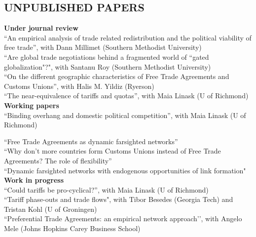 \documentclass[11pt]{res}
\begin{document}
\begin{resume}
\section{UNPUBLISHED PAPERS}\vspace{2mm}
{\bf Under journal review}\vspace{1.5mm}\\
{``An empirical analysis of trade related redistribution and the political viability of free trade''}, with Dann Millimet (Southern Methodist University) \vspace{1.5mm}\\
{``Are global trade negotiations behind a fragmented world of ``gated globalization"?"}, with Santanu Roy (Southern Methodist University) \vspace{1.5mm}\\
{``On the different geographic characteristics of Free Trade Agreements and Customs Unions''}, with Halis M. Yildiz (Ryerson) \vspace{1.5mm}\\
{``The near-equivalence of tariffs and quotas''}, with Maia Linask (U of Richmond) \vspace{1.5mm}\\

{\bf Working papers}\vspace{1.5mm}\\
{``Binding overhang and domestic political competition''}, with Maia Linask (U of Richmond)
\newpage
\phantom{.}\vspace{.4cm}

{ ``Free Trade Agreements as dynamic farsighted networks''} \vspace{1.5mm}\\
{``Why don't more countries form Customs Unions instead of Free Trade Agreements? The role of flexibility''} \vspace{1.5mm}\\
{``Dynamic farsighted networks with endogenous opportunities of link formation"}\vspace{1.5mm}\\

{\bf Work in progress}\vspace{1.5mm}\\
{``Could tariffs be pro-cyclical?''}, with Maia Linask (U of Richmond) \vspace{1.5mm}\\
{``Tariff phase-outs and trade flows"}, with Tibor Besedes (Georgia Tech) and Tristan Kohl (U of Groningen) \vspace{1.5mm}\\
{``Preferential Trade Agreements: an empirical network approach'}', with Angelo Mele (Johns Hopkins Carey Business School)\vspace{1.5mm}\\


\end{resume}
\end{document}
